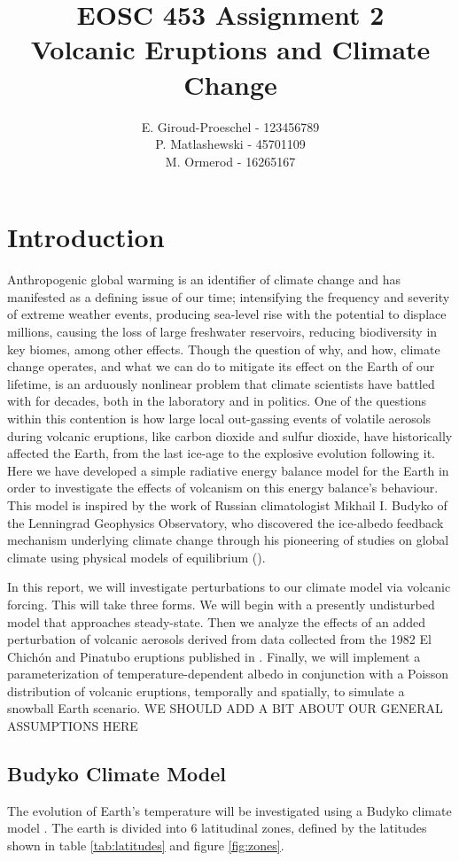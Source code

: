 \documentclass[12pt]{article}
\title{EOSC 453 Assignment 2\\
\large Volcanic Eruptions and Climate Change}
\author{
    E. Giroud-Proeschel - 123456789 \\
    P. Matlashewski - 45701109\\
    M. Ormerod - 16265167
}
\begin{document}
\maketitle
\newpage
\tableofcontents
\newpage

\section{Introduction}
Anthropogenic global warming is an identifier of climate change and has
manifested as a defining issue of our time; intensifying the frequency and
severity of extreme weather events, producing sea-level rise with the potential
to displace millions, causing the loss of large freshwater reservoirs, reducing
biodiversity in key biomes, among other effects. Though the question of why, and
how, climate change operates, and what we can do to mitigate its effect on the
Earth of our lifetime, is an arduously nonlinear problem that climate scientists
have battled with for decades, both in the laboratory and in politics. One of
the questions within this contention is how large local out-gassing events of
volatile aerosols during volcanic eruptions, like carbon dioxide and sulfur
dioxide, have historically affected the Earth, from the last ice-age to the
explosive evolution following it. Here we have developed a simple radiative
energy balance model for the Earth in order to investigate the effects of
volcanism on this energy balance's behaviour. This model is inspired by the
work of Russian climatologist Mikhail I. Budyko of the Lenningrad Geophysics
Observatory, who discovered the ice-albedo feedback mechanism underlying climate
change through his pioneering of studies on global climate using physical models
of equilibrium (\cite{budyko_albedo}).

In this report, we will investigate perturbations to our climate model via
volcanic forcing. This will take three forms. We will begin with a presently
undisturbed model that approaches steady-state. Then we analyze the effects of
an added perturbation of volcanic aerosols derived from data collected from the
1982 El Chichón and Pinatubo eruptions published in \cite{robock}. Finally, we
will implement a parameterization of temperature-dependent albedo in conjunction
with a Poisson distribution of volcanic eruptions, temporally and spatially, to
simulate a snowball Earth scenario.
WE SHOULD ADD A BIT ABOUT OUR GENERAL ASSUMPTIONS HERE

\subsection{Budyko Climate Model}
The evolution of Earth's temperature will be investigated using a Budyko
climate model \parencite{budyko_albedo}. The earth is divided into 6 latitudinal
zones, defined by the latitudes shown in table \ref{tab:latitudes} and figure
\ref{fig:zones}.
\end{document}
